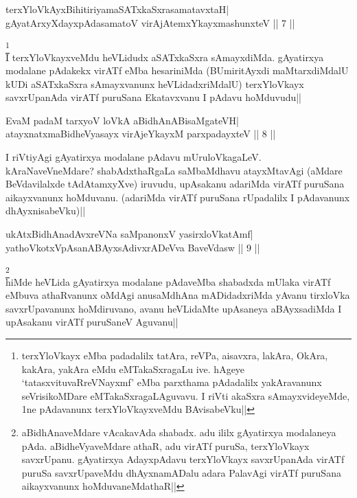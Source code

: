 
\begin{shl}
terxYloVkAyxBihitiriyamaSATxkaSxrasamatavxtaH| \\
gAyatArxyXdayxpAdasamatoV virAjA\s \s temxYkayxmashunxteV \hfill ||  7 || 
\end{shl}

\begin{artha} 
\footnote[2]{terxYloVkayx eMba padadalilx tatAra, reVPa, aisavxra, 
lakAra, OkAra, kakAra, yakAra eMdu eMTakaSxragaLu ive. hAgeye 
`tatasxvituvaRreVNayxmf' eMba parxthama pAdadalilx yakAravanunx 
seVrisikoMDare eMTakaSxragaLAguvavu. I riVti akaSxra sAmayxvideyeMde, 
1ne pAdavanunx terxYloVkayxveMdu BAvisabeVku||}\\
I terxYloVkayxveMdu heVLidudx aSATxkaSxra sAmayxdiMda. gAyatirxya 
modalane pAdakekx virATf eMba hesariniMda (BUmiritAyxdi maMtarxdiMdalU 
kUDi aSATxkaSxra sAmayxvanunx heVLidadxriMdalU) terxYloVkayx 
savxrUpanAda virATf puruSana Ekatavxvanu I pAdavu hoMduvudu||
\end{artha}

\begin{shl}
EvaM padaM tarxyoV loVkA aBidhAnABisaMgateVH| \\
atayxnatxmaBidheVyasayx virAjeYkayxM parxpadayxteV \hfill ||  8 || 
\end{shl}

\begin{artha} 
I riVtiyAgi gAyatirxya modalane pAdavu mUruloVkagaLeV. 
kAraNaveVneMdare? shabAdxthaRgaLa saMbaMdhavu atayxMtavAgi (aMdare 
BeVdavilalxde tAdAtamxyXve) iruvudu, upAsakanu adariMda virATf 
puruSana aikayxvanunx hoMduvanu. (adariMda virATf puruSana rUpadalilx 
I pAdavanunx dhAyxnisabeVku)||
\end{artha}


\begin{shl}
ukAtxBidhAnadAvxreVNa saMpanonxV yasirxloVkatAmf| \\
yathoVkotxVpAsanABAyxsAdivxrADeVva BaveVdasw \hfill ||  9 || 
\end{shl}

\begin{artha} 
\footnote[1]{aBidhAnaveMdare vAcakavAda shabadx. adu ililx gAyatirxya 
modalaneya pAda. aBidheVyaveMdare athaR, adu virATf puruSa, 
terxYloVkayx savxrUpanu. gAyatirxya AdayxpAdavu terxYloVkayx 
savxrUpanAda virATf puruSa savxrUpaveMdu dhAyxnamADalu adara PalavAgi 
virATf puruSana aikayxvanunx hoMduvaneMdathaR||}\\
hiMde heVLida gAyatirxya modalane pAdaveMba shabadxda mUlaka virATf 
eMbuva athaRvanunx oMdAgi anusaMdhAna mADidadxriMda yAvanu tirxloVka 
savxrUpavanunx hoMdiruvano, avanu heVLidaMte upAsaneya aBAyxsadiMda I 
upAsakanu virATf puruSaneV Aguvanu||
\end{artha}

